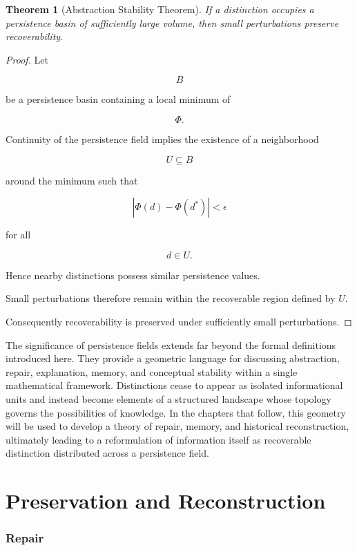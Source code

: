 \documentclass[12pt,oneside]{article}
\newtheorem{theorem}{Theorem}[section] \newtheorem{lemma}[theorem]{Lemma} \newtheorem{proposition}[theorem]{Proposition} \newtheorem{corollary}[theorem]{Corollary}
\theoremstyle{definition}
\begin{document}
\begin{theorem}[Abstraction Stability Theorem]

If a distinction occupies a persistence basin of sufficiently large volume, then small perturbations preserve recoverability.

\end{theorem}

\begin{proof}

Let

\[
B
\]

be a persistence basin containing a local minimum of

\[
\Phi.
\]

Continuity of the persistence field implies the existence of a neighborhood

\[
U\subseteq B
\]

around the minimum such that

\[
|\Phi(d)-\Phi(d^*)|
<
\epsilon
\]

for all

\[
d\in U.
\]

Hence nearby distinctions possess similar persistence values.

Small perturbations therefore remain within the recoverable region defined by \(U\).

Consequently recoverability is preserved under sufficiently small perturbations.

\end{proof}

The significance of persistence fields extends far beyond the formal definitions introduced here. They provide a geometric language for discussing abstraction, repair, explanation, memory, and conceptual stability within a single mathematical framework. Distinctions cease to appear as isolated informational units and instead become elements of a structured landscape whose topology governs the possibilities of knowledge. In the chapters that follow, this geometry will be used to develop a theory of repair, memory, and historical reconstruction, ultimately leading to a reformulation of information itself as recoverable distinction distributed across a persistence field.

\part{Preservation and Reconstruction}

\section{Repair}
\end{document}
